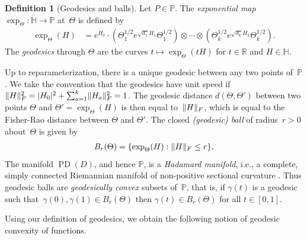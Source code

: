 \documentclass[aos]{imsart}
\theoremstyle{definition}
\newtheorem{definition}[theorem]{Definition}
\numberwithin{equation}{section}
\DeclareMathOperator{\PD}{PD}
\DeclarePairedDelimiter{\abs}{\lvert}{\rvert}
\DeclarePairedDelimiter{\norm}{\lVert}{\rVert}
\newcommand{\R}{{\mathbb{R}}}
\renewcommand{\P}{{\mathbb{P}}}
\renewcommand{\H}{{\mathbb{H}}}
\newcommand{\ot}{\otimes}
\begin{document}
\begin{definition}[Geodesics and balls]
Let $P\in\P$.
The \emph{exponential map} $\exp_\Theta \colon \H \to \P$ at~$\Theta$ is defined by
\begin{align*}
  \exp_\Theta(H) &= e^{H_0} \cdot ( \Theta_1^{1/2} e^{\sqrt{d_1} H_1} \Theta_1^{1/2}) \ot \cdots \ot (\Theta_k^{1/2} e^{\sqrt{d_k} H_k} \Theta_k^{1/2}).
\end{align*}
The \emph{geodesics} through $\Theta$ are the curves $t \mapsto \exp_\Theta(t H)$ for $t\in\R$ and $H\in\H$.


Up to reparameterization, there is a unique geodesic between any two points of~$\P$.
We take the convention that the geodesics have unit speed if $\norm{H}_F^2 = \abs{H_0}^2 + \sum_{a=1}^k \norm{H_a}_F^2 = 1$.
The geodesic distance $d(\Theta,\Theta')$ between two points $\Theta$ and $\Theta'=\exp_\Theta(H)$ is then equal to~$\norm H_F$, which is equal to the Fisher-Rao distance between $\Theta$ and $\Theta'$. The closed \emph{(geodesic) ball} of radius~$r>0$ about~$\Theta$ is given by
\begin{align*}
  B_r(\Theta) = \{ \exp_\Theta(H) : \norm H_F \leq r \},
\end{align*}
The manifold $\PD(D)$, and hence $\P$, is a \emph{Hadamard manifold}, i.e., a complete, simply connected Riemannian manifold of non-positive sectional curvature \citep{bacak2014convex}. Thus geodesic balls are \emph{geodesically convex} subsets of~$\P$, that is, if $\gamma(t)$ is a geodesic such that~$\gamma(0),\gamma(1) \in B_r(\Theta)$ then $\gamma(t) \in B_r(\Theta)$ for all $t\in[0,1]$.
\end{definition}

Using our definition of geodesics, we obtain the following notion of geodesic convexity of functions.
\end{document}
